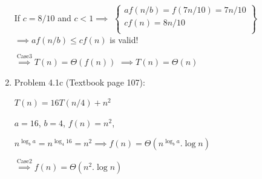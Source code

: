 \documentclass[11pt]{article}
\begin{document}
\begin{enumerate}
	If $c=8/10$ and $c<1 \overset{}{\implies} $
	$
	    \left\{\begin{array}{lr}
        	af(n/b)=f(7n/10)=7n/10\\
        	cf(n)=8n/10\\
        \end{array}\right\}
    $ 
    $ \overset{}{\implies} af(n/b)\leq cf(n)$
     is valid!
    
    $ \overset{\mathrm{Case 3}}{\implies} T(n)=\Theta(f(n))$
    $ \overset{}{\implies} T(n)=\Theta(n)$



\item Problem 4.1c (Textbook page 107):

	$T(n)=16T(n/4)+n^{2}$
	
	$a=16$, $b=4$, $f(n)=n^{2}$,
	
	$n^{\log_b{a}} \overset{}{=} n^{\log_{4}{16}}=n^{2}  
	\overset{}{\implies} f(n)=\Theta(n^{\log_b{a}}.\log{n})$
	
	$	\overset{\mathrm{Case 2}}{\implies} f(n)=\Theta(n^{2}.\log{n})$
	
	























   
\end{enumerate}
\end{document}
